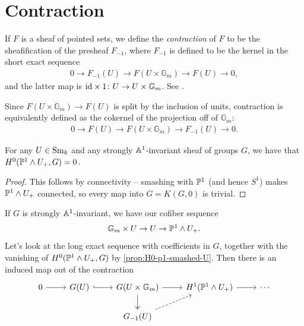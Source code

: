 \documentclass[11pt,openany]{book}
\let\smashprod\wedge
\begin{document}
\section{Contraction}

\begin{definition} If $F$ is a sheaf of pointed sets, we define the \textit{contraction} of $F$ to be the sheafification of the presheaf $F_{-1}$, where $F_{-1}$ is defined to be the kernel in the short exact sequence
\begin{align*}
    0 \to F_{-1}(U) \to F(U \times \mathbb{G}_m) \to F(U) \to 0,
\end{align*}
and the latter map is $\id \times 1 \colon U \to U \times \mathbb{G}_m$. See \cite[2.1.10]{ABH-Freudenthal}.
\end{definition}

\begin{remark} Since $F(U \times \mathbb{G}_m) \to F(U)$ is split by the inclusion of units, contraction is equivalently defined as the cokernel of the projection off of $\mathbb{G}_m$:
\begin{align*}
    0 \to F(U) \to F(U \times \mathbb{G}_m) \to F_{-1}(U) \to 0.
\end{align*}
\end{remark}

\begin{proposition}\label{prop:H0-p1-smashed-U} 
For any $U \in \Sm_k$ and any strongly $\A^1$-invariant sheaf of groups $G$, we have that $H^0(\P^1\smashprod U_+,G) = 0$.
\end{proposition}
\begin{proof} This follows by connectivity -- smashing with $\P^1$ (and hence $S^1$) makes $\P^1 \smashprod U_+$ connected, so every map into $G=K(G,0)$ is trivial.
\end{proof}

\begin{remark} If $G$ is strongly $\A^1$-invariant, we have our cofiber sequence
\begin{align*}
    \mathbb{G}_m \times U \to  U \to \P^1 \smashprod U_+.
\end{align*}
Let's look at the long exact sequence with coefficients in $G$, together with the vanishing of $H^0(\P^1 \smashprod U_+,G)$ by \autoref{prop:H0-p1-smashed-U}. Then there is an induced map out of the contraction
\[ \begin{tikzcd}
    0\rar & G(U) \rar[hook] & G(U \times \mathbb{G}_m)\rar\dar[two heads] & H^1(\P^1 \smashprod U_+)\rar & \cdots \\
     &  & G_{-1}(U)\ar[ur,dashed]
\end{tikzcd} \]
\end{remark}
\end{document}
